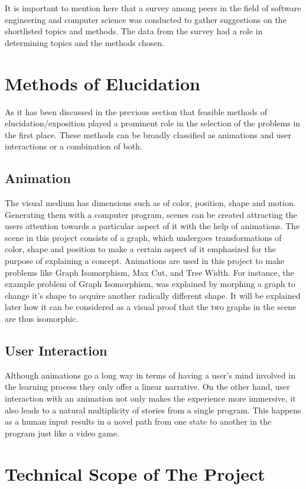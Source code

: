 It is important to mention here that a survey among
peers in the field of software engineering and computer science was conducted to 
gather suggestions on the shortlisted topics and methods.
The data from the survey had a role in determining topics and the methods chosen.


\section{Methods of Elucidation}
As it has been discussed in the previous section that feasible methods of
elucidation/exposition played a prominent role in the selection of the problems
in the first place. These methods can be broadly classified as animations and
user interactions or a combination of both.


\subsection{Animation}
The visual medium has dimensions such as of color, position, shape and motion.
Generating them with a computer program, scenes can be created attracting the
users attention towards a particular aspect of it with the help of animations.
The scene in this project consists of a graph, which undergoes transformations
of color, shape and position to make a certain aspect of it emphasized for the
purpose of explaining a concept.  Animations are used in this project to make
problems like Graph Isomorphism, Max Cut, and Tree Width. For instance, the
example problem of Graph Isomorphism, was explained by morphing a graph to change
it's shape to acquire another radically different shape. It will be explained
later how it can be considered as a visual proof that the two graphs in the
scene are thus isomorphic.

\subsection{User Interaction}
Although animations go a long way in terms of having a user's mind involved in
the learning process they only offer a linear narrative. On the other hand,
user interaction with an animation not only makes the experience more
immersive, it also leads to a natural multiplicity of stories from a single
program. This happens as a human input results in a novel path from one state to
another in the program just like a video game.

\section{Technical Scope of The Project}

